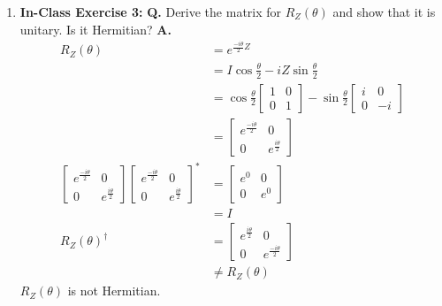 \documentclass[main.tex]{subfiles}
\begin{document}
\begin{enumerate}
\item[] \textbf{In-Class Exercise 3:} \textbf{Q.} Derive the matrix for $R_{Z}(\theta)$ and show that it is unitary. Is it Hermitian? \textbf{A.}
    \begin{align*}
        R_{Z}(\theta)               & = e^{\frac{-i \theta}{2} Z}\\
                                    & = I\cos \frac{\theta}{2} - i Z\sin\frac{\theta}{2}\\
                                    & = \cos\frac{\theta}{2}\left[\begin{array}{ll}1&0\\0&1\end{array}\right]
                                    -\sin\frac{\theta}{2}\left[\begin{array}{ll}i&0\\0&-i\end{array}\right]\\
                                    & = \left[\begin{array}{cc}e^{\frac{-i \theta}{2}} & 0 \\ 
                                    0 & e^{\frac{i \theta}{2}}\end{array}\right]\\
        \left[\begin{array}{ll}
        e^{\frac{-i \theta}{2}}&0\\ 
        0 & e^{\frac{i \theta}{2}}
        \end{array}\right]
        \left[\begin{array}{ll}
        e^{\frac{-i \theta}{2}}&0\\ 
        0 & e^{\frac{i \theta}{2}}
        \end{array}\right]^*        & = \left[\begin{array}{ll}e^0&0\\0&e^0\end{array}\right]\\
                                    & = I\\
        R_{Z}(\theta)^{\dagger}     & = \left[\begin{array}{ll}e^{\frac{i \theta}{2}}&0\\
                                    0 & e^{\frac{-i \theta}{2}}\end{array}\right]\\
                                    & \neq R_{Z}(\theta)
    \end{align*}
    $R_{Z}(\theta)$ is not Hermitian.
    

\end{enumerate}
\end{document}
